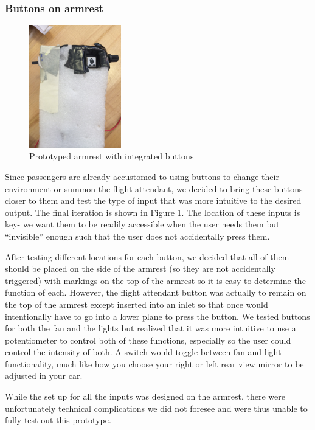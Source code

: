 \subsubsection*{Buttons on armrest}

\begin{figure}[h]
  \centering
     \includegraphics[width=4cm]{images/FoamArmrest.jpg}
   \caption{ Prototyped armrest with integrated buttons}
  \label{fig:FoamArmrest.jpg}
\end{figure}

Since passengers are already accustomed to using buttons to change their environment or summon the flight attendant, we decided to bring these buttons closer to them and test the type of input that was more intuitive to the desired output. The final iteration is shown in  Figure \ref{fig:FoamArmrest.jpg}. The location of these inputs is key- we want them to be readily accessible when the user needs them but “invisible” enough such that the user does not accidentally press them. 

After testing different locations for each button, we decided that all of them should be placed on the side of the armrest (so they are not accidentally triggered) with markings on the top of the armrest so it is easy to determine the function of each. However, the flight attendant button was actually to remain on the top of the armrest except inserted into an inlet so that once would intentionally have to go into a lower plane to press the button. We tested buttons for both the fan and the lights but realized that it was more intuitive to use a potentiometer to control both of these functions, especially so the user could control the intensity of both. A switch would toggle between fan and light functionality, much like how you choose your right or left rear view mirror to be adjusted in your car.  

While the set up for all the inputs was designed on the armrest, there were unfortunately technical complications we did not foresee and were thus unable to fully test out this prototype. 


